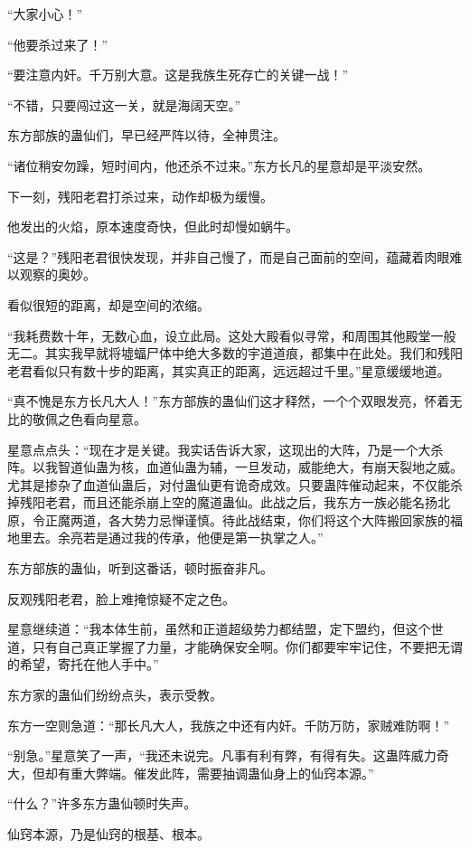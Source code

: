 \begin{this_body}
“大家小心！”

“他要杀过来了！”

“要注意内奸。千万别大意。这是我族生死存亡的关键一战！”

“不错，只要闯过这一关，就是海阔天空。”

东方部族的蛊仙们，早已经严阵以待，全神贯注。

“诸位稍安勿躁，短时间内，他还杀不过来。”东方长凡的星意却是平淡安然。

下一刻，残阳老君打杀过来，动作却极为缓慢。

他发出的火焰，原本速度奇快，但此时却慢如蜗牛。

“这是？”残阳老君很快发现，并非自己慢了，而是自己面前的空间，蕴藏着肉眼难以观察的奥妙。

看似很短的距离，却是空间的浓缩。

“我耗费数十年，无数心血，设立此局。这处大殿看似寻常，和周围其他殿堂一般无二。其实我早就将墟蝠尸体中绝大多数的宇道道痕，都集中在此处。我们和残阳老君看似只有数十步的距离，其实真正的距离，远远超过千里。”星意缓缓地道。

“真不愧是东方长凡大人！”东方部族的蛊仙们这才释然，一个个双眼发亮，怀着无比的敬佩之色看向星意。

星意点点头：“现在才是关键。我实话告诉大家，这现出的大阵，乃是一个大杀阵。以我智道仙蛊为核，血道仙蛊为辅，一旦发动，威能绝大，有崩天裂地之威。尤其是掺杂了血道仙蛊后，对付蛊仙更有诡奇成效。只要蛊阵催动起来，不仅能杀掉残阳老君，而且还能杀崩上空的魔道蛊仙。此战之后，我东方一族必能名扬北原，令正魔两道，各大势力忌惮谨慎。待此战结束，你们将这个大阵搬回家族的福地里去。余亮若是通过我的传承，他便是第一执掌之人。”

东方部族的蛊仙，听到这番话，顿时振奋非凡。

反观残阳老君，脸上难掩惊疑不定之色。

星意继续道：“我本体生前，虽然和正道超级势力都结盟，定下盟约，但这个世道，只有自己真正掌握了力量，才能确保安全啊。你们都要牢牢记住，不要把无谓的希望，寄托在他人手中。”

东方家的蛊仙们纷纷点头，表示受教。

东方一空则急道：“那长凡大人，我族之中还有内奸。千防万防，家贼难防啊！”

“别急。”星意笑了一声，“我还未说完。凡事有利有弊，有得有失。这蛊阵威力奇大，但却有重大弊端。催发此阵，需要抽调蛊仙身上的仙窍本源。”

“什么？”许多东方蛊仙顿时失声。

仙窍本源，乃是仙窍的根基、根本。


\end{this_body}
